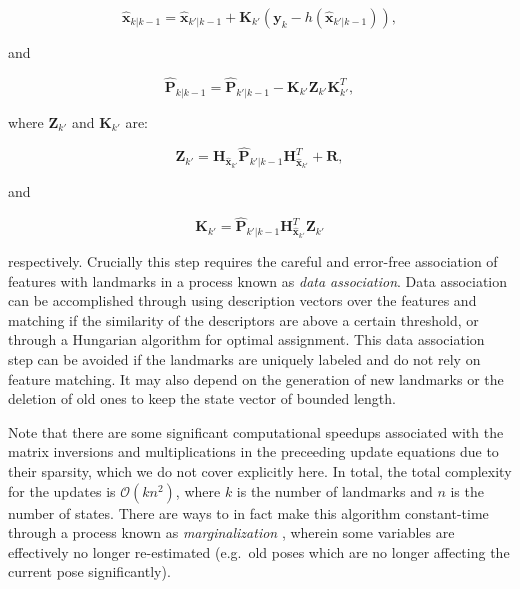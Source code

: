 \begin{equation}
    \hat{\boldsymbol{x}}_{k|k-1}= \hat{\boldsymbol{x}}_{k'|k-1} + \boldsymbol{K}_{k'}(\boldsymbol{y}_{k} - h(\hat{\boldsymbol{x}}_{k'|k-1})),
\end{equation}

\noindent and

\begin{equation}
    \hat{\boldsymbol{P}}_{k|k-1}= \hat{\boldsymbol{P}}_{k'|k-1} - \boldsymbol{K}_{k'} \boldsymbol{Z}_{k'} \boldsymbol{K}_{k'}^T,
\end{equation}

\noindent where $\boldsymbol{Z}_{k'}$ and $\boldsymbol{K}_{k'}$ are:

\begin{equation}
    \boldsymbol{Z}_{k'} = \boldsymbol{H}_{\hat{\boldsymbol{x}}_{k'}} \hat{\boldsymbol{P}}_{k'|k-1} \boldsymbol{H}_{\hat{\boldsymbol{x}}_{k'}}^T + \boldsymbol{R},
\end{equation}

\noindent and

\begin{equation}
    \boldsymbol{K}_{k'} = \hat{\boldsymbol{P}}_{k'|k-1} \boldsymbol{H}_{\hat{\boldsymbol{x}}_{k'}}^T \boldsymbol{Z}_{k'}
\end{equation}

\noindent respectively. Crucially this step requires the careful and error-free association of features with landmarks in a process known as \emph{data association}.  Data association can be accomplished through using description vectors over the features and matching if the similarity of the descriptors are above a certain threshold, or through a Hungarian algorithm for optimal assignment. This data association step can be avoided if the landmarks are uniquely labeled and do not rely on feature matching. It may also depend on the generation of new landmarks or the deletion of old ones to keep the state vector of bounded length.

Note that there are some significant computational speedups associated with the matrix inversions and multiplications in the preceeding update equations due to their sparsity, which we do not cover explicitly here. In total, the total complexity for the updates is $\mathcal{O}(kn^2)$, where $k$ is the number of landmarks and $n$ is the number of states. There are ways to in fact make this algorithm constant-time through a process known as \emph{marginalization} \cite{sibley2010sliding}, wherein some variables are effectively no longer re-estimated (e.g.\ old poses which are no longer affecting the current pose significantly).

